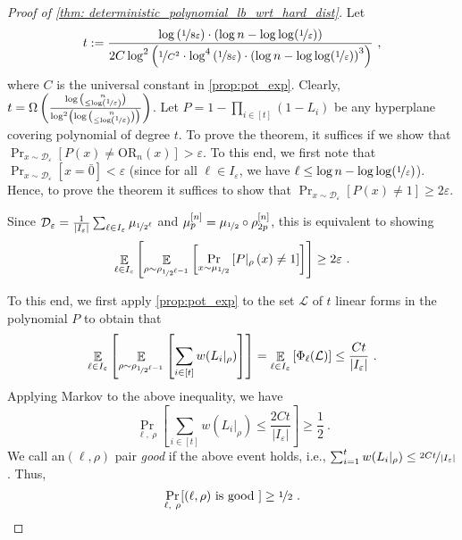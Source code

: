 \documentclass[10pt,a4paper]{article}
\theoremstyle{plain}
\theoremstyle{definition}
\renewcommand{\epsilon}{\varepsilon}
\newcommand{\eps}{\epsilon}
\newcommand{\OR}{\mathrm{OR}}
\newcommand{\calD}{{\mathcal{D}}}
\newcommand{\calL}{{\mathcal{L}}}
\newcommand{\cbra}[1]{\left(#1\right)}
\newcommand{\half}{\nicefrac{1}{2}}
\newcommand{\E}[2]{\mathop{\mathbb{E}}_{#1}\left[ #2 \right]}
\renewcommand{\calL}{\mathcal{L}}
\newcommand{\lbdetail}{\frac{\log\cbra{\nicefrac1{8\eps}}\cdot\cbra{\log
      n - \llepsinv}}{2C \log^2\cbra{\nicefrac1{C^2}\cdot
      \log^4\cbra{\nicefrac1{8\eps}}\cdot \cbra{\log n -
        \llepsinv}^3}}}
\newcommand{\lbmain}{\log \binom{n}{\leq \log\cbra{\nicefrac1{\eps}}}}
\newcommand{\lb}{\Omega \cbra{\frac{\lbmain}{\log^2 \cbra{\lbmain}}}}
\newcommand{\llepsinv}{\log\log(\nicefrac1\eps)}
\begin{document}
\begin{proof}[Proof of {\cref{thm:
      deterministic_polynomial_lb_wrt_hard_dist}}]
Let \[t := \lbdetail\ ,\]
where $C$ is the universal constant in \cref{prop:pot_exp}. Clearly, $t = \lb$.  
Let $P = 1 - \prod_{i \in [t]}(1-L_i)$ be any hyperplane covering
polynomial of degree $t$. To prove the theorem, it suffices if we show
that $\Pr_{x \sim \calD_\eps}[ P(x) \neq \OR_n(x) ] > \eps$. To this end, we first note that $\Pr_{x\sim \calD_\eps}[x = \bar{0}] < \eps$ (since for all $\ell \in I_\eps$, we have $\ell \leq \log n - \llepsinv$). Hence, to prove the theorem it suffices to show that $\Pr_{x \sim \calD_\eps}[ P(x) \neq 1 ] \geq 2\eps$.

Since
$\calD_\eps = \frac{1}{|I_\eps|}
    \sum_{\ell \in I_\eps} \mu_{\nicefrac1{2^{\ell}}}$ and
    $\mu_p^{[n]} = \mu_{\half}\circ \rho_{2p}^{[n]}$, this is
    equivalent to showing
\begin{equation}\label{eq:contrad}
\E{\ell \in I_\eps}{\E{\rho \sim \rho_{\nicefrac1{2^{\ell-1}}}}{
    \Pr_{x\sim\mu_{\half}}\left[P|_{\rho}\left(x\right)\neq1
 \right]}} \geq
    2\eps\ .
\end{equation}

To this end, we first apply \cref{prop:pot_exp} to the set $\calL$ of
$t$ linear forms in the polynomial $P$ to obtain that
\[\E{\ell \in I_\eps}{\E{\rho\sim
      \rho_{\nicefrac1{2^{\ell-1}}}}{\sum_{i\in [t]}w(L_i|_\rho)}}=\E{\ell \in I_\eps}{\Phi_\ell(\calL)} \leq 
              \frac{Ct}{|I_\eps|}\ .\]   
Applying Markov to the above inequality, we have
\[ \Pr_{\ell,\  \rho}\left[ \sum_{i \in [t]} w(L_i|_\rho) \leq
      \frac{2Ct}{|I_\eps|}\right] \geq \frac12\ .
\]
We call an$(\ell,\rho)$ pair \emph{good} if the above event holds,
i.e., $\sum_{i=1}^t w(L_i|_{\rho}) \leq
\nicefrac{2Ct}{|I_\eps|}$. Thus, 
\begin{equation}\label{eq:good}
\Pr_{\ell, \ \rho}[ (\ell,\rho) \text{ is good }] \geq \half\ .
\end{equation}


\end{proof}
\end{document}
